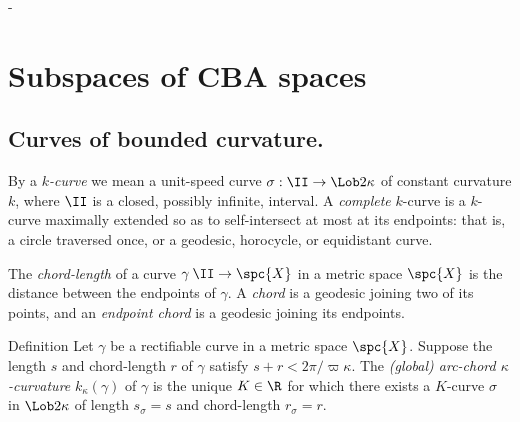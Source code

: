 -%



\chapter{Subspaces of CBA spaces}

\section{Curves of bounded curvature.}\label{sec:cbc}

By a {\it $k$-curve}   we mean a unit-speed curve $\sigma:\II\to\Lob2\kappa$ of constant
curvature $k$, where $\II$ is a closed, possibly infinite, interval.  A {\it complete} $k$-curve is a $k$-curve maximally extended so as to self-intersect at most at its endpoints: that is, a circle traversed once, or a  geodesic, horocycle, or equidistant curve.

The \emph{chord-length} of a curve $\gamma\:\II\to\spc{X}$ in a metric space $\spc{X}$ is the distance between the endpoints of $\gamma$.  A \emph{chord} is a geodesic joining two of its points, and an \emph{endpoint chord} is a geodesic joining its endpoints.

\begin{thm}{Definition}\label{def:arc-chord}
Let $\gamma$ be a rectifiable curve in a metric space $\spc{X}$. Suppose the length $s$ and chord-length $r$ of $\gamma$ satisfy $s+r <
2\pi/\varpi\kappa$.  The \emph{(global) arc-chord $\kappa$-curvature }$k_{\kappa}( \gamma)$ of $\gamma$ is the unique $ K\in\R$
for which there exists a $ K$-curve $\sigma$ in $\Lob2\kappa$ of length $s_\sigma=s$ and
chord-length $r_\sigma=r$. 

% 
\end{thm}


